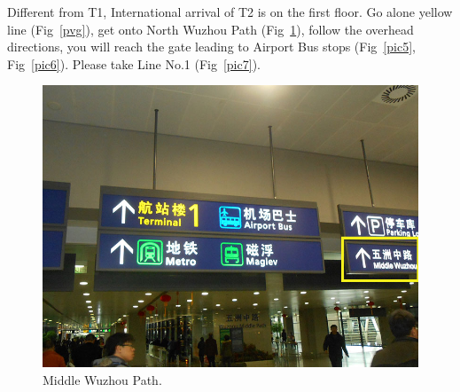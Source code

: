 \documentclass[11pt]{article}
\begin{document}
 Different from T1, International arrival of T2 is on the first floor. Go alone yellow line (Fig~\ref{pvg}), get onto North Wuzhou Path (Fig~\ref{pic4}), follow the overhead directions, you will reach the gate leading to Airport Bus stops (Fig~\ref{pic5}, Fig~\ref{pic6}). Please take Line No.1 (Fig~\ref{pic7}). 
 \begin{figure}[h]
    \centering
    	\includegraphics{image010.jpg}
    	\caption{Middle Wuzhou Path.\label{pic4}}
 \end{figure}
\end{document}
